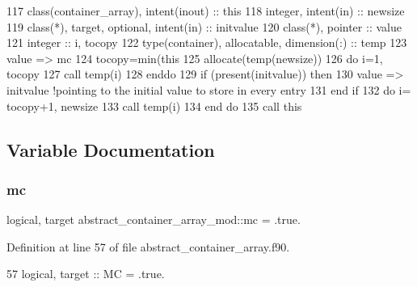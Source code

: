 \begin{DoxyCode}
117     \textcolor{keywordtype}{class}(container\_array), \textcolor{keywordtype}{intent(inout)} :: this
118     \textcolor{keywordtype}{integer}, \textcolor{keywordtype}{intent(in)} :: newsize
119     \textcolor{keywordtype}{class}(*), \textcolor{keywordtype}{target}, \textcolor{keywordtype}{optional}, \textcolor{keywordtype}{intent(in)} :: initvalue
120     \textcolor{keywordtype}{class}(*), \textcolor{keywordtype}{pointer} :: value
121     \textcolor{keywordtype}{integer} :: i, tocopy
122     \textcolor{keywordtype}{type}(container), \textcolor{keywordtype}{allocatable}, \textcolor{keywordtype}{dimension(:)} :: temp
123     \textcolor{keywordtype}{value} => mc
124     tocopy=min(this%
125     \textcolor{keyword}{allocate}(temp(newsize))
126     \textcolor{keywordflow}{do} i=1, tocopy
127         \textcolor{keyword}{call }temp(i)%
128 \textcolor{keywordflow}{    enddo}
129     \textcolor{keywordflow}{if} (\textcolor{keyword}{present}(initvalue)) \textcolor{keywordflow}{then}
130         \textcolor{keywordtype}{value} => initvalue \textcolor{comment}{!pointing to the initial value to store in every entry}
131 \textcolor{keywordflow}{    end if}
132     \textcolor{keywordflow}{do} i= tocopy+1, newsize
133         \textcolor{keyword}{call }temp(i)%
134 \textcolor{keywordflow}{    end do}
135     \textcolor{keyword}{call }this%
\end{DoxyCode}


\subsection{Variable Documentation}
\mbox{\label{namespaceabstract__container__array__mod_a536c39baa7114f8ddff2dec5a90a894e}} 
\subsubsection{\texorpdfstring{mc}{mc}}
{\footnotesize\ttfamily logical, target abstract\+\_\+container\+\_\+array\+\_\+mod\+::mc = .true.\hspace{0.3cm}{\ttfamily [private]}}



Definition at line 57 of file abstract\+\_\+container\+\_\+array.\+f90.


\begin{DoxyCode}
57     \textcolor{keywordtype}{logical}, \textcolor{keywordtype}{target} :: MC = .true.
\end{DoxyCode}
